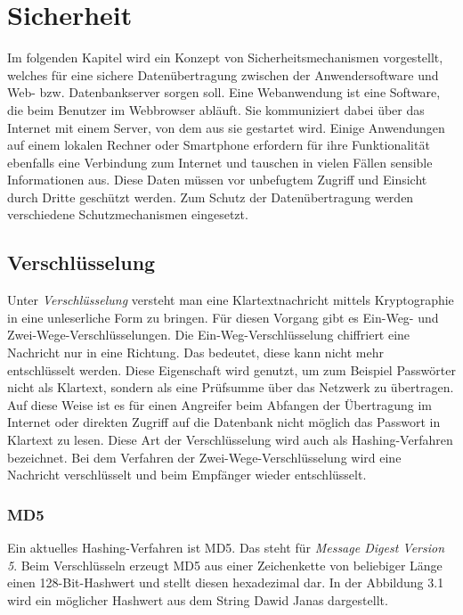 
\chapter{Sicherheit} 

Im folgenden Kapitel wird ein Konzept von Sicherheitsmechanismen vorgestellt,
welches f\"ur eine sichere Daten\"ubertragung zwischen der Anwendersoftware und Web- bzw. Datenbankserver sorgen soll.
Eine Webanwendung ist eine Software, die beim Benutzer im Webbrowser abl\"auft. 
Sie kommuniziert dabei \"uber das Internet mit einem Server, von dem aus sie gestartet wird.
Einige Anwendungen auf einem lokalen Rechner oder Smartphone erfordern f\"ur ihre Funktionalit\"at ebenfalls eine Verbindung zum Internet
und tauschen in vielen F\"allen sensible Informationen aus.
Diese Daten m\"ussen vor unbefugtem Zugriff und Einsicht durch Dritte gesch\"utzt werden.
Zum Schutz der Daten\"ubertragung werden verschiedene Schutzmechanismen eingesetzt. 
\cite[S. 499]{PHP_MySQL:01} \cite{Sicherheit:01}\\

\section{Verschl\"usselung}

Unter \emph{Verschl\"usselung} versteht man eine Klartextnachricht mittels Kryptographie in eine unleserliche Form zu bringen.
F\"ur diesen Vorgang gibt es Ein-Weg- und Zwei-Wege-Verschl\"usselungen.
Die Ein-Weg-Verschl\"usselung chiffriert eine Nachricht nur in eine Richtung. 
Das bedeutet, diese kann nicht mehr entschl\"usselt werden.
Diese Eigenschaft wird genutzt, um zum Beispiel Passw\"orter nicht als Klartext,
sondern als eine Pr\"ufsumme \"uber das Netzwerk zu \"ubertragen.
Auf diese Weise ist es f\"ur einen Angreifer beim Abfangen der \"Ubertragung im Internet oder direkten Zugriff
auf die Datenbank nicht m\"oglich das Passwort in Klartext zu lesen.
Diese Art der Verschl\"usselung wird auch als Hashing-Verfahren bezeichnet.
Bei dem Verfahren der Zwei-Wege-Verschl\"usselung wird eine Nachricht verschl\"usselt und beim Empf\"anger wieder entschl\"usselt.\\

\subsection{MD5}
Ein aktuelles Hashing-Verfahren ist MD5. 
Das steht f\"ur \emph{Message Digest Version 5}\cite[S. 507]{PHP_MySQL:01}.
Beim Verschl\"usseln erzeugt MD5 aus einer Zeichenkette von beliebiger L\"ange einen 128-Bit-Hashwert und stellt diesen hexadezimal dar.
In der Abbildung 3.1 wird ein m\"oglicher Hashwert aus dem String \dq Dawid Janas\dq{} dargestellt.\\

